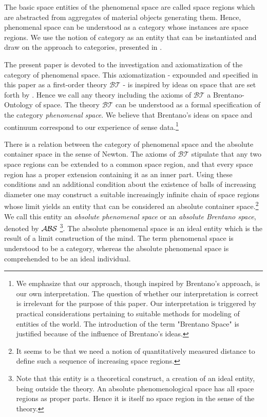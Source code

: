 \documentclass{ao2e}
\begin{document}
The basic space entities of the phenomenal space are called space regions which are abstracted from aggregates of material objects generating them. Hence, phenomenal space can be understood as a category whose instances are space regions. We use the notion of category as an entity that can be instantiated and draw on
the approach to categories, presented in \cite{gracia-j-1999-a}.

The present paper is devoted to the investigation and axiomatization of the category of phenomenal space. This axiomatization - expounded and specified in this paper as a first-order theory $\mathcal{BT}$ - is inspired by ideas on space that are set forth by \cite{brentano-f-1976-a}. Hence we call any theory including the axioms of $\mathcal{BT}$ a Brentano-Ontology of space. The theory $\mathcal{BT}$ can be understood as a formal specification of the category {\it phenomenal space}. We believe that Brentano's ideas on space and continuum correspond to our experience of sense data.\footnote{We emphasize that our approach, though inspired by Brentano's approach, is our own interpretation.  The question of whether our interpretation is correct is irrelevant for the purpose of this paper. Our interpretation is triggered by practical considerations pertaining to suitable methods for modeling of entities of the world. The introduction of the term "Brentano Space" is justified because of the influence of Brentano's ideas.}

There is a relation between the category of phenomenal space and the absolute container space in the sense of Newton. The axioms of $\mathcal{BT}$ stipulate that any two space regions can be extended to a common 
space region, and that every space region has a proper extension containing it as an inner part. Using these conditions and an additional condition about the existence of balls of increasing diameter one may construct a suitable increasingly infinite chain of space regions whose limit yields an entity that can be considered an absolute container space.\footnote{It seems to be that we need a notion of quantitatively measured distance to define such a sequence of increasing space regions.}
We call this entity an \textit{absolute phenomenal space} or an \textit{absolute Brentano space}, denoted by ${\cal ABS}$ \footnote{Note that this entity is a theoretical construct, a creation of an ideal entity, being outside the theory. An absolute phenomenological space has all space regions as proper parts. Hence it is itself no space region in the sense of the theory.}. The absolute phenomenal space is an ideal entity which is the result of a limit construction of the mind. The term phenomenal space is understood to be a category, whereas the absolute phenomenal space is comprehended to be an ideal individual.
\end{document}
